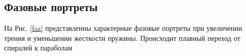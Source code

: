 \documentclass[a4paper,12pt,titlepage]{article}
\theoremstyle{definition}
\theoremstyle{theorem}
\theoremstyle{definition}
\begin{document}
\subsection{Фазовые портреты}
На Рис. \ref*{faz} представленны характерные фазовые 
портреты при увеличении трения 
и уменьшении жесткости пружины. Происходит плавный переход от спиралей к параболам
\begin{figure}[h!!!]
    \begin{minipage}[h]{0.49\linewidth}
    \end{minipage}
    \hfill
    \begin{minipage}[h]{0.49\linewidth}

\end{minipage}
\end{figure}
\end{document}
